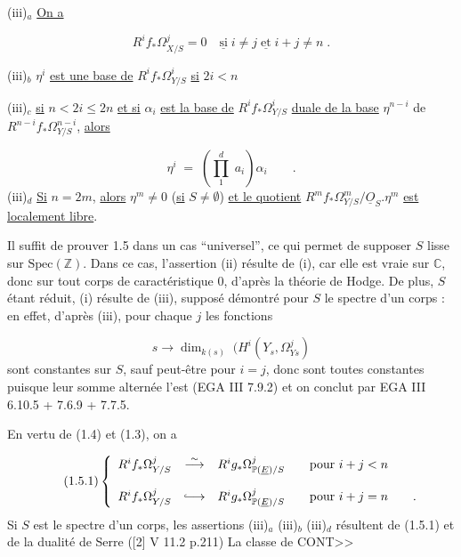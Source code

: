 (iii)$_a$ \underline{On a}

\begin{equation*}
R^i f_* \Omega^j_{X/S} = 0 \quad \underline{\mbox{si}} \; i \neq j \; \underline{\mbox{et}} \; i+j \neq n \; .
\end{equation*}


(iii)$_b$ $\eta^i$ \underline{est une base de} $R^i f_* \Omega^i_{Y/S}$ \underline{si} $2i < n$

(iii)$_c$ \underline{si} $n<2i\leq 2n$ \underline{et si} $\alpha_i$ \underline{est la base de} $R^i f_* \Omega^i_{Y/S}$ \underline{duale de la base} $\eta^{n-i}$ de $R^{n-i} f_* \Omega^{n-i}_{Y/S}$, \underline{alors}

\begin{equation*}
\eta^i \;=\; \left( \prod_1^d \; a_i \right) \alpha_i \qquad .
\end{equation*}
(iii)$_d$ \underline{Si} $n = 2m$, \underline{alors} $\eta^m \neq 0$ (\underline{si} $S \neq \emptyset$) \underline{et le quotient} $R^m f_* \Omega^m_{Y/S}/\underline{O}_S . \eta^m$ \underline{est localement libre}.

Il suffit de prouver 1.5 dans un cas ``universel'', ce qui permet de supposer $S$ lisse sur $\mathrm{Spec}(\mathbb{Z})$. Dans ce cas, l'assertion (ii) résulte de (i), car elle est vraie sur $\mathbb{C}$, donc sur tout corps de caractéristique $0$, d'après la théorie de Hodge. De plus, $S$ étant réduit, (i) résulte de (iii), supposé démontré pour $S$ le spectre d'un corps : en effet, d'après (iii), pour chaque $j$ les fonctions

\begin{equation*}
s \longrightarrow \dim_{k(s)} \; (H^i(Y_s,\Omega^j_{Ys})
\end{equation*}
sont constantes sur $S$, sauf peut-être pour $i = j$, donc sont toutes constantes puisque leur somme alternée l'est (EGA III 7.9.2) et on conclut par EGA III 6.10.5 + 7.6.9 + 7.7.5.

En vertu de (1.4) et (1.3), on a

\begin{equation}\tag{1.5.1}
\left\{
\begin{array}{ccl}
R^i f_* \Omega^j_{Y/S} & \stackrel{\sim}{\longrightarrow} & R^i g_* \Omega^j_{\mathbb{P}(\underline{E})/S} \qquad \mbox{pour } i+j < n \\[3ex]
R^i f_* \Omega^j_{Y/S} & \lhook\joinrel\longrightarrow & R^i g_* \Omega^j_{\mathbb{P}(\underline{E})/S} \qquad \mbox{pour } i+j = n \qquad .
\end{array}
\right.
\end{equation}
Si $S$ est le spectre d'un corps, les assertions (iii)$_a$ (iii)$_b$ (iii)$_d$ résultent de (1.5.1) et de la dualité de Serre ([2] V 11.2 p.211) La classe de CONT>>


